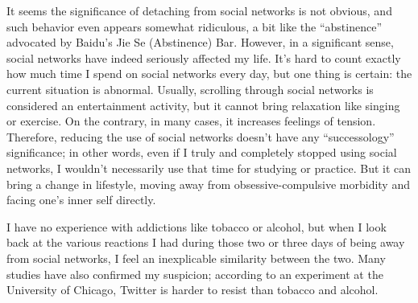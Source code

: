 It seems the significance of detaching from social networks is not obvious, and such behavior even appears somewhat ridiculous, a bit like the ``abstinence'' advocated by Baidu's Jie Se (Abstinence) Bar. However, in a significant sense, social networks have indeed seriously affected my life. It's hard to count exactly how much time I spend on social networks every day, but one thing is certain: the current situation is abnormal. Usually, scrolling through social networks is considered an entertainment activity, but it cannot bring relaxation like singing or exercise. On the contrary, in many cases, it increases feelings of tension. Therefore, reducing the use of social networks doesn't have any ``successology'' significance; in other words, even if I truly and completely stopped using social networks, I wouldn't necessarily use that time for studying or practice. But it can bring a change in lifestyle, moving away from obsessive-compulsive morbidity and facing one's inner self directly.

I have no experience with addictions like tobacco or alcohol, but when I look back at the various reactions I had during those two or three days of being away from social networks, I feel an inexplicable similarity between the two. Many studies have also confirmed my suspicion; according to an experiment at the University of Chicago, Twitter is harder to resist than tobacco and alcohol.

\bye